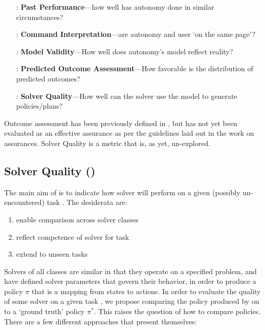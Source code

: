         \begin{itemize}
            \item [\xH{}:] \textbf{Past Performance}---how well has autonomy done in similar circumstances?
            \item [\xI{}:] \textbf{Command Interpretation}---are autonomy and user `on the same page'?
            \item [\xM{}:] \textbf{Model Validity}---How well does autonomy's model reflect reality?
            \item [\xP{}:] \textbf{Predicted Outcome Assessment}---How favorable is the distribution of predicted outcomes?
            \item [\xQ{}:] \textbf{Solver Quality}---How well can the solver use the model to generate policies/plans?
        \end{itemize}

    Outcome assessment has been previously defined in \cite{Aitken2016-cv}, but has not yet been evaluated as an effective assurance as per the guidelines laid out in the work on assurances. Solver Quality is a metric that is, as yet, un-explored.

\subsection{Solver Quality (\xQ)} \label{sec:SQ}
    The main aim of \xQ{} is to indicate how solver \solve{} will perform on a given (possibly un-encountered) task \task{}. The desiderata are:

    \begin{enumerate}[label=\textbf{D\arabic*}]
        \item enable comparison across solver classes \label{itm:d1}
        \item reflect competence of solver \solve{} for task \task{} \label{itm:d2}
        \item extend to unseen tasks \label{itm:d3}
    \end{enumerate}

    Solvers of all classes are similar in that they operate on a specified problem, and have defined solver parameters that govern their behavior, in order to produce a policy $\pi$ that is a mapping from states to actions. In order to evaluate the quality of some solver on a given task \task, we propose comparing the policy \policy{} produced by \solver{} on \task{} to a `ground truth' policy $\pi^*$. This raises the question of how to compare policies. There are a few different approaches that present themselves:

